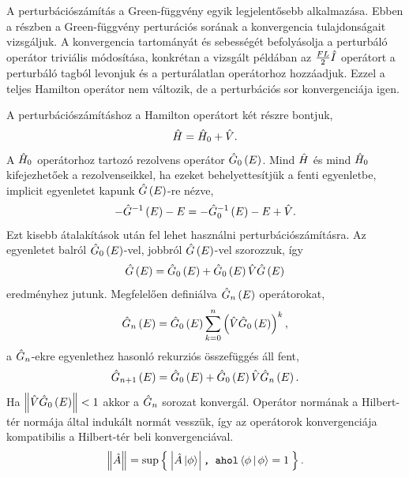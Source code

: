 A perturbációszámítás a Green-függvény egyik legjelentősebb alkalmazása. Ebben a részben a Green-függvény perturációs sorának a konvergencia tulajdonságait vizsgáljuk. A konvergencia tartományát és sebességét befolyásolja a perturbáló operátor triviális módosítása, konkrétan a vizsgált példában az $\frac{FL}{2}\hat{I}$ operátort a perturbáló tagból levonjuk és a perturálatlan operátorhoz hozzáadjuk. Ezzel a teljes Hamilton operátor nem változik, de a perturbációs sor konvergenciája igen.

A perturbációszámításhoz a Hamilton operátort két részre bontjuk,
\begin{equation}
	\hat{H} = \hat{H}_0 + \hat{V}.
\end{equation}
A $\hat{H}_0$ operátorhoz tartozó rezolvens operátor $\hat{G}_0\left(E\right)$. Mind $\hat{H}$ és mind $\hat{H}_0$ kifejezhetőek a rezolvenseikkel, ha ezeket behelyettesítjük a fenti egyenletbe, implicit egyenletet kapunk $\hat{G}\left(E\right)$-re nézve,
\begin{equation}
	-\hat{G}^{-1}\left(E\right) - E = -\hat{G}_0^{-1}\left(E\right) - E + \hat{V}.
\end{equation}
Ezt kisebb átalakítások után fel lehet használni perturbációszámításra. Az egyenletet balról $\hat{G}_0\left(E\right)$-vel, jobbról $\hat{G}\left(E\right)$-vel szorozzuk, így
\begin{equation}
	\hat{G}\left(E\right) = \hat{G}_0\left(E\right) + \hat{G}_0\left(E\right)\hat{V}\hat{G}\left(E\right)
	\label{green:pertmaster}
\end{equation}
eredményhez jutunk. Megfelelően definiálva $\hat{G}_n\left(E\right)$ operátorokat,
\begin{equation}
	\hat{G}_n\left(E\right) = \hat{G}_0\left(E\right)\sum_{k=0}^n\left(\hat{V}\hat{G}_0\left(E\right)\right)^k,
\end{equation}
a $\hat{G}_n$-ekre  egyenlethez hasonló rekurziós összefüggés áll fent,
\begin{equation}
	\hat{G}_{n+1}\left(E\right) = \hat{G}_0\left(E\right) + \hat{G}_0\left(E\right)\hat{V}\hat{G}_n\left(E\right).
	\label{perturbation:rekurzió}
\end{equation}
Ha $\left\lVert \hat{V}\hat{G}_0\left(E\right) \right\rVert < 1$ akkor a $\hat{G}_n$ sorozat konvergál. Operátor normának a Hilbert-tér normája által indukált normát vesszük, így az operátorok konvergenciája kompatibilis a Hilbert-tér beli konvergenciával.
\begin{equation}
	\left\lVert \hat{A} \right\rVert=\sup \Set{\left\lvert \hat{A}\Ket{\phi} \right\rvert \texttt{, ahol} \Braket{\phi|\phi}=1}.
\end{equation}
